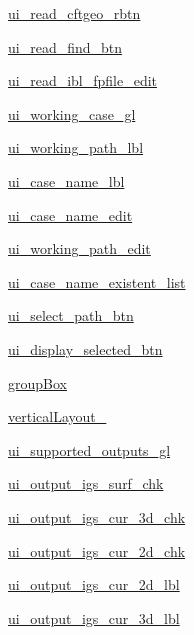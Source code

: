 \begin{DoxyCompactItemize}
\item 
\hyperlink{a00074_a3ccbf6ded4e6de7d70da7777441a3227}{ui\+\_\+read\+\_\+cftgeo\+\_\+rbtn}
\item 
\hyperlink{a00074_a94ac3b9c86462bc353b5c9a53b961a7d}{ui\+\_\+read\+\_\+find\+\_\+btn}
\item 
\hyperlink{a00074_a16200a07fd06dae2ce5c12674d04b497}{ui\+\_\+read\+\_\+ibl\+\_\+fpfile\+\_\+edit}
\item 
\hyperlink{a00074_a050e1f0c2f0a5c8d15ca21021459c06d}{ui\+\_\+working\+\_\+case\+\_\+gl}
\item 
\hyperlink{a00074_aae8ee2dceedfebed42a95b5122615de8}{ui\+\_\+working\+\_\+path\+\_\+lbl}
\item 
\hyperlink{a00074_a0d4435462e6a1f2672c93af7e87b719c}{ui\+\_\+case\+\_\+name\+\_\+lbl}
\item 
\hyperlink{a00074_ac790262e3ac621cfe957cdd36f94d817}{ui\+\_\+case\+\_\+name\+\_\+edit}
\item 
\hyperlink{a00074_a7978ca560b83fbc4bd3859b7bba05153}{ui\+\_\+working\+\_\+path\+\_\+edit}
\item 
\hyperlink{a00074_a007ebda4f46ac96952c59e60a2fa8f3b}{ui\+\_\+case\+\_\+name\+\_\+existent\+\_\+list}
\item 
\hyperlink{a00074_a0f508ef0b3e47a027a63dd3cde363ef4}{ui\+\_\+select\+\_\+path\+\_\+btn}
\item 
\hyperlink{a00074_adc08aa0dfe6e33f10acea28994425d3a}{ui\+\_\+display\+\_\+selected\+\_\+btn}
\item 
\hyperlink{a00074_a4ed36f6ea3986be4c380c6f5ba4587d4}{group\+Box}
\item 
\hyperlink{a00074_ab105030a0e14f15ea1514f18cd3202b7}{vertical\+Layout\+\_}
\item 
\hyperlink{a00074_a1c1efdbb64f8efbd47af031c8817f807}{ui\+\_\+supported\+\_\+outputs\+\_\+gl}
\item 
\hyperlink{a00074_a204f840f1c7dc77ccd5d23fcbe6dd3c7}{ui\+\_\+output\+\_\+igs\+\_\+surf\+\_\+chk}
\item 
\hyperlink{a00074_a306e3ab99bf3dfab97fa540a27d15cbe}{ui\+\_\+output\+\_\+igs\+\_\+cur\+\_\+3d\+\_\+chk}
\item 
\hyperlink{a00074_ab532154d6273918060a4d4ef92599e20}{ui\+\_\+output\+\_\+igs\+\_\+cur\+\_\+2d\+\_\+chk}
\item 
\hyperlink{a00074_a56d9b0f2bb1161b50e6cd020b28106b2}{ui\+\_\+output\+\_\+igs\+\_\+cur\+\_\+2d\+\_\+lbl}
\item 
\hyperlink{a00074_a47a1df1f89ca935117346098ed96fd98}{ui\+\_\+output\+\_\+igs\+\_\+cur\+\_\+3d\+\_\+lbl}

\end{DoxyCompactItemize}
